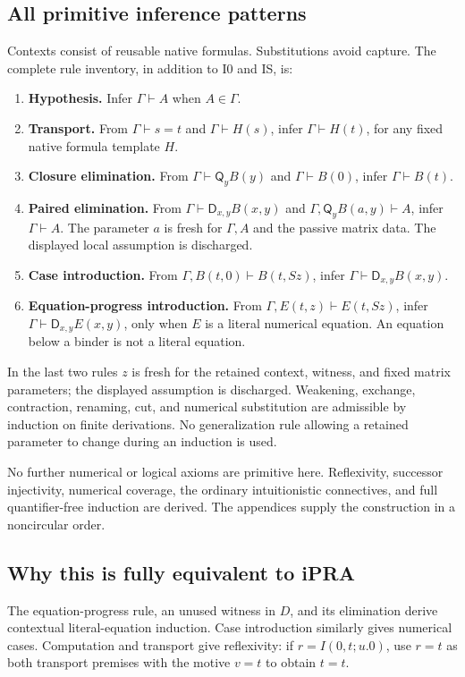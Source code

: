 \documentclass[11pt]{article}
\theoremstyle{definition}\newtheorem{definition}[theorem]{Definition}
\newcommand{\Q}{\mathsf Q}
\newcommand{\D}{\mathsf D}
\begin{document}
\subsection{All primitive inference patterns}
Contexts consist of reusable native formulas. Substitutions avoid capture.
The complete rule inventory, in addition to I0 and IS, is:
\begin{enumerate}[label=\textbf{\arabic*.}]
\item \textbf{Hypothesis.} Infer $\Gamma\vdash A$ when $A\in\Gamma$.
\item \textbf{Transport.} From $\Gamma\vdash s=t$ and
$\Gamma\vdash H(s)$, infer $\Gamma\vdash H(t)$, for any fixed native
formula template $H$.
\item \textbf{Closure elimination.} From $\Gamma\vdash\Q_yB(y)$
and $\Gamma\vdash B(0)$, infer $\Gamma\vdash B(t)$.
\item \textbf{Paired elimination.} From $\Gamma\vdash\D_{x,y}B(x,y)$
and $\Gamma,\Q_yB(a,y)\vdash A$, infer $\Gamma\vdash A$.
The parameter $a$ is fresh for $\Gamma,A$ and the passive matrix data.
The displayed local assumption is discharged.
\item \textbf{Case introduction.} From
$\Gamma,B(t,0)\vdash B(t,Sz)$, infer
$\Gamma\vdash\D_{x,y}B(x,y)$.
\item \textbf{Equation-progress introduction.} From
$\Gamma,E(t,z)\vdash E(t,Sz)$, infer
$\Gamma\vdash\D_{x,y}E(x,y)$, only when $E$ is a literal numerical
equation. An equation below a binder is not a literal equation.
\end{enumerate}
In the last two rules $z$ is fresh for the retained context, witness,
and fixed matrix parameters; the displayed assumption is discharged.
Weakening, exchange, contraction, renaming, cut, and numerical
substitution are admissible by induction on finite derivations.
No generalization rule allowing a retained parameter to change during
an induction is used.

No further numerical or logical axioms are primitive here. Reflexivity,
successor injectivity, numerical coverage, the ordinary intuitionistic
connectives, and full quantifier-free induction are derived. The
appendices supply the construction in a noncircular order.

\subsection{Why this is fully equivalent to iPRA}
The equation-progress rule, an unused witness in $D$, and its elimination
derive contextual literal-equation induction. Case introduction similarly
gives numerical cases. Computation and transport give reflexivity:
if $r=I(0,t;u.0)$, use $r=t$ as both transport premises with the
motive $v=t$ to obtain $t=t$.
\end{document}
